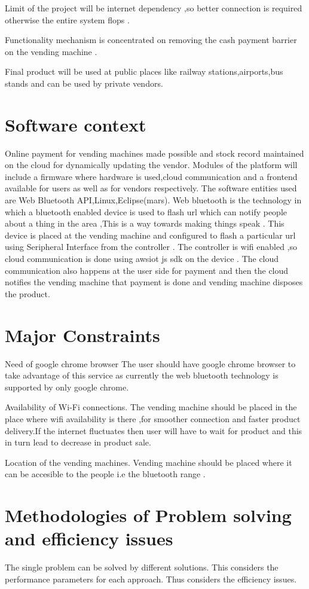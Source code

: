 \documentclass[oneside,a4paper,12pt]{report}
\begin{document}
Limit of the project will be internet dependency ,so better connection is required otherwise the entire system flops .


Functionality mechanism is concentrated on removing the cash payment barrier on the vending machine .

Final product will be used at public places like railway stations,airports,bus stands and can be used by private vendors.
\section{Software context} 
Online payment for vending machines made possible and stock record maintained on the cloud for dynamically updating the vendor. Modules of the platform will include a firmware where hardware is used,cloud communication and a frontend available for users as well as for vendors respectively.
The software entities used are Web Bluetooth API,Linux,Eclipse(mars).
Web bluetooth is the technology in which a bluetooth enabled device is used to flash url which can notify people about a thing in the area ,This is a way towards making things speak .
This device is placed at the vending machine and configured to flash a particular url using Seripheral Interface from the controller .
The controller is wifi enabled ,so cloud communication is done using awsiot js sdk on the device .
The cloud communication also happens at the user side for  payment and then the cloud notifies the vending machine that payment is done and vending machine disposes the product.
\section{Major Constraints}
Need of google chrome browser
The user should have google chrome browser to take advantage of this service as currently the web bluetooth technology is supported by only google chrome.

Availability of Wi-Fi connections.
The vending machine should be placed in the place where wifi availability is there ,for smoother connection and faster product delivery.If the internet fluctuates then user will have to wait for product and this in turn lead to decrease in product sale.
 
Location of the vending machines.
Vending machine should be placed where it can be accesible to the people i.e the bluetooth range .


\section{Methodologies of Problem solving and efficiency issues}
The single problem can be solved by different solutions.  This considers the performance parameters for each approach. Thus considers the efficiency issues.
\end{document}
